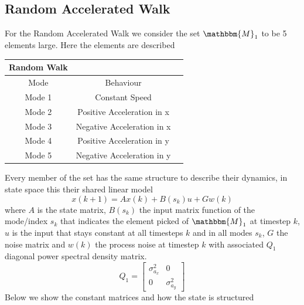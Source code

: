 \documentclass[twocolumn]{article}
\begin{document}
\subsection*{Random Accelerated Walk}
For the Random Accelerated Walk we consider the set $\mathbbm{M}_{1}$ to be 5 elements large.
Here the elements are described
\begin{center}
    \begin{tabular}{||c||c|c|}%
        \hline
        Random Walk                         \\
        \hline\hline
        Mode   & Behaviour                  \\ [0.5ex]
        \hline\hline
        Mode 1 & Constant Speed             \\
        \hline
        Mode 2 & Positive Acceleration in x \\
        \hline
        Mode 3 & Negative Acceleration in x \\
        \hline
        Mode 4 & Positive Acceleration in y \\
        \hline
        Mode 5 & Negative Acceleration in y \\ [1ex]
        \hline
    \end{tabular}
\end{center}
Every member of the set has the same structure
to describe their dynamics, in state space this their shared linear model
\begin{equation*}
    x(k+1)= Ax(k) + B(s_{k})u + Gw(k)
\end{equation*}
where $A$ is the state matrix, $B(s_{k})$ the input matrix function of the mode/index $s_{k}$ that indicates the element picked of $\mathbbm{M}_{1}$ at timestep $k$,
$u$ is the input that stays constant at all timesteps $k$ and in all modes $s_{k}$, $G$ the noise matrix and $w(k)$ the process noise at timestep
$k$ with associated $Q_{1}$ diagonal power spectral density matrix.
\begin{equation*}
    Q_{1}=\begin{bmatrix}
        \sigma^{2}_{a_{x}} & 0                  \\
        0                  & \sigma^{2}_{a_{y}}
    \end{bmatrix}
\end{equation*}
Below we show the constant matrices and how the state is structured
\end{document}
